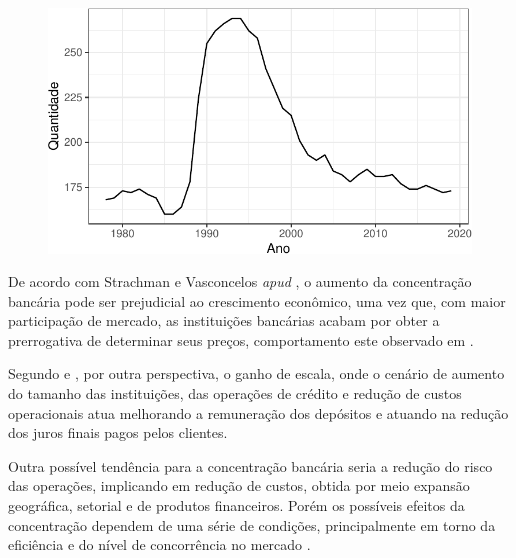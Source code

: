 \documentclass[12pt,12pt,openright,oneside,a4paper,chapter=TITLE,section=TITLE,subsection=TITLE,subsubsection=TITLE,english,french,spanish,portugues,sumario=tradicional]{abntex2}
\begin{document}
\begin{figure}

\begin{center}\includegraphics{12-exportedfigures/concetration-1} \end{center}
\label{fig:concentracao}
\end{figure}

De acordo com Strachman e Vasconcelos \emph{apud} \textcite{camargo:2009}, o aumento
da concentração bancária pode ser prejudicial ao crescimento econômico, uma vez
que, com maior participação de mercado, as instituições bancárias acabam por
obter a prerrogativa de determinar seus preços, comportamento este observado em
\textcite{klein:1971}.

Segundo \textcite{camargo:2009} e \textcite{dantas:2012}, por outra perspectiva, o ganho de escala, onde o cenário de aumento do tamanho das instituições, das operações de crédito e redução de custos operacionais atua melhorando a remuneração dos depósitos e atuando na redução dos juros finais pagos pelos clientes.

Outra possível tendência para a concentração bancária seria a redução do risco
das operações, implicando em redução de custos, obtida por meio expansão
geográfica, setorial e de produtos financeiros. Porém os possíveis efeitos da
concentração dependem de uma série de condições, principalmente em torno da
eficiência e do nível de concorrência no mercado \cite{camargo:2009}.
\end{document}
